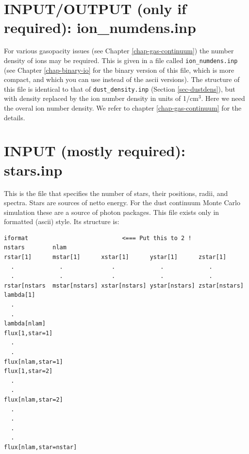\documentclass{report}
\newenvironment{asciibox}%
  {\begin{list}{}{%
    \setlength{\topsep}{0.5em}%
    \setlength{\parskip}{0em}%
    \setlength{\parsep}{0em}%
    \setlength{\itemsep}{0em}%
    \setlength{\rightmargin}{0em}%
    \setlength{\leftmargin}{3.0em}%
    \setlength{\labelsep}{1em}%
    \setlength{\labelwidth}{2em}%
  }\normalfont\footnotesize\item}
  {\end{list}}
\begin{document}
\section{INPUT/OUTPUT (only if required): ion\_numdens.inp}
For various gasopacity issues (see Chapter \ref{chap-gas-continuum}) the
number density of ions may be required. This is given in a file
called {\small\tt ion\_numdens.inp} (see Chapter \ref{chap-binary-io}
for the binary version of this file, which is more compact, and which you
can use instead of the ascii versions). The structure of this file is
identical to that of {\small\tt dust\_density.inp} (Section
\ref{sec-dustdens}), but with density replaced by the ion number density in
units of 1/cm$^3$. Here we need the overal ion number density.  We refer to
chapter \ref{chap-gas-continuum} for the details. 


\section{INPUT (mostly required): stars.inp}
\label{sec-stars}
This is the file that specifies the number of stars, their positions,
radii, and spectra. Stars are sources of netto energy. For the dust
continuum Monte Carlo simulation these are a source of photon packages.
This file exists only in formatted (ascii) style. Its structure is:
\begin{asciibox}\begin{verbatim}
iformat                           <=== Put this to 2 !
nstars        nlam
rstar[1]      mstar[1]      xstar[1]      ystar[1]      zstar[1]
  .             .              .             .             .
  .             .              .             .             .
rstar[nstars  mstar[nstars] xstar[nstars] ystar[nstars] zstar[nstars]
lambda[1]
  .
  .
lambda[nlam]
flux[1,star=1]
  .
  .
flux[nlam,star=1]
flux[1,star=2]
  .
  .
flux[nlam,star=2]
  .
  .
  .
  .
flux[nlam,star=nstar]
\end{verbatim}\end{asciibox}
\end{document}
